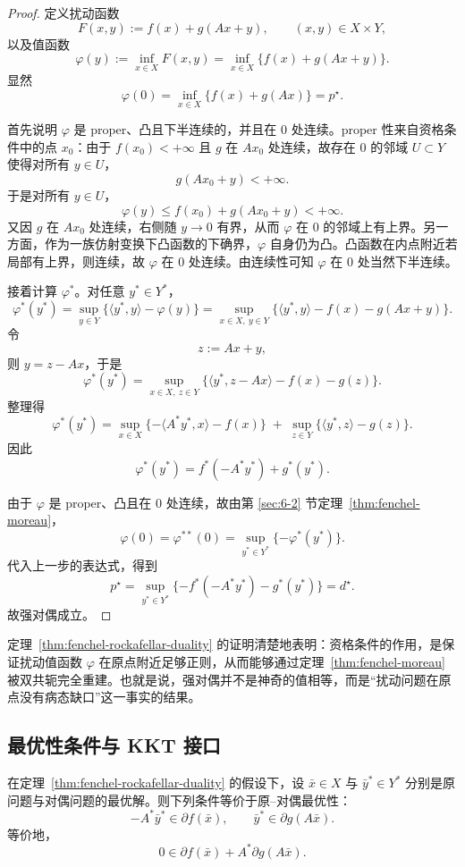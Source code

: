 \begin{proof}
定义扰动函数
\[
F(x,y):=f(x)+g(Ax+y),\qquad (x,y)\in X\times Y,
\]
以及值函数
\[
\varphi(y):=\inf_{x\in X}F(x,y)=\inf_{x\in X}\{f(x)+g(Ax+y)\}.
\]
显然
\[
\varphi(0)=\inf_{x\in X}\{f(x)+g(Ax)\}=p^\star.
\]

首先说明 $\varphi$ 是 proper、凸且下半连续的，并且在 $0$ 处连续。proper 性来自资格条件中的点 $x_0$：由于 $f(x_0)<+\infty$ 且 $g$ 在 $Ax_0$ 处连续，故存在 $0$ 的邻域 $U\subset Y$ 使得对所有 $y\in U$，
\[
g(Ax_0+y)<+\infty.
\]
于是对所有 $y\in U$，
\[
\varphi(y)\le f(x_0)+g(Ax_0+y)<+\infty.
\]
又因 $g$ 在 $Ax_0$ 处连续，右侧随 $y\to 0$ 有界，从而 $\varphi$ 在 $0$ 的邻域上有上界。另一方面，作为一族仿射变换下凸函数的下确界，$\varphi$ 自身仍为凸。凸函数在内点附近若局部有上界，则连续，故 $\varphi$ 在 $0$ 处连续。由连续性可知 $\varphi$ 在 $0$ 处当然下半连续。

接着计算 $\varphi^\ast$。对任意 $y^\ast\in Y^\ast$，
\[
\varphi^\ast(y^\ast)
=
\sup_{y\in Y}\{\langle y^\ast,y\rangle-\varphi(y)\}
=
\sup_{x\in X,\ y\in Y}\{\langle y^\ast,y\rangle-f(x)-g(Ax+y)\}.
\]
令
\[
z:=Ax+y,
\]
则 $y=z-Ax$，于是
\[
\varphi^\ast(y^\ast)
=
\sup_{x\in X,\ z\in Y}\{\langle y^\ast,z-Ax\rangle-f(x)-g(z)\}.
\]
整理得
\[
\varphi^\ast(y^\ast)
=
\sup_{x\in X}\{-\langle A^\ast y^\ast,x\rangle-f(x)\}
\;+\;
\sup_{z\in Y}\{\langle y^\ast,z\rangle-g(z)\}.
\]
因此
\[
\varphi^\ast(y^\ast)=f^\ast(-A^\ast y^\ast)+g^\ast(y^\ast).
\]

由于 $\varphi$ 是 proper、凸且在 $0$ 处连续，故由第 \ref{sec:6-2} 节定理~\ref{thm:fenchel-moreau}，
\[
\varphi(0)=\varphi^{\ast\ast}(0)
=
\sup_{y^\ast\in Y^\ast}\{-\varphi^\ast(y^\ast)\}.
\]
代入上一步的表达式，得到
\[
p^\star
=
\sup_{y^\ast\in Y^\ast}\{-f^\ast(-A^\ast y^\ast)-g^\ast(y^\ast)\}
=
d^\star.
\]
故强对偶成立。
\end{proof}

\begin{remark}
定理~\ref{thm:fenchel-rockafellar-duality} 的证明清楚地表明：资格条件的作用，是保证扰动值函数 $\varphi$ 在原点附近足够正则，从而能够通过定理~\ref{thm:fenchel-moreau} 被双共轭完全重建。也就是说，强对偶并不是神奇的值相等，而是“扰动问题在原点没有病态缺口”这一事实的结果。
\end{remark}

\subsection{最优性条件与 KKT 接口}

\begin{corollary}\label{cor:fenchel-kkt-subdifferential}
在定理~\ref{thm:fenchel-rockafellar-duality} 的假设下，设 $\bar x\in X$ 与 $\bar y^\ast\in Y^\ast$ 分别是原问题与对偶问题的最优解。则下列条件等价于原--对偶最优性：
\[
-A^\ast \bar y^\ast\in \partial f(\bar x),
\qquad
\bar y^\ast\in \partial g(A\bar x).
\]
等价地，
\[
0\in \partial f(\bar x)+A^\ast \partial g(A\bar x).
\]
\end{corollary}

